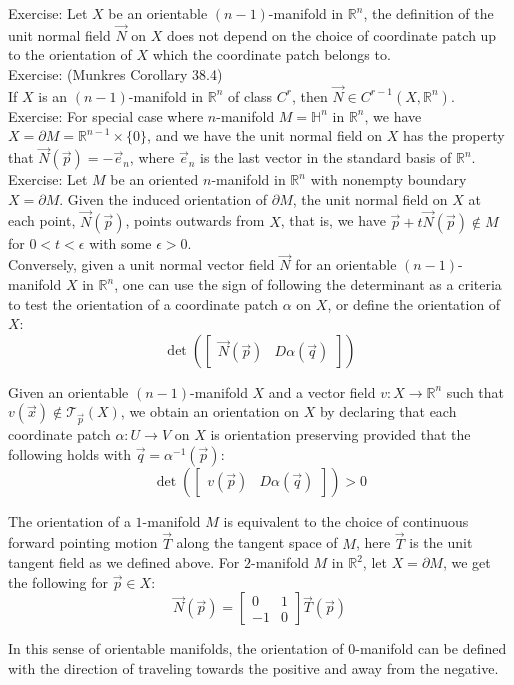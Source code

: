 \documentclass[15pt]{book}
\theoremstyle{break}
\theoremstyle{break}
\newcommand{\R}{\mathbb{R}}
\newcommand{\T}{\mathcal{T}}
\newcommand{\pd}{\partial}
\newcommand{\bmat}[1]{\begin{bmatrix} #1 \end{bmatrix}}
\newcommand{\exercise}{\color{green}Exercise: \color{black}}
\begin{document}
\exercise Let $X$ be an orientable $(n-1)$-manifold in $\R^n$, the definition of the unit normal field $\vec{N}$ on $X$ does not depend on the choice of coordinate patch up to the orientation of $X$ which the coordinate patch belongs to.\\ 

\exercise (Munkres Corollary 38.4)\\
If $X$ is an $(n-1)$-manifold in $\R^n$ of class $C^r$, then $\vec{N} \in C^{r-1}(X, \R^n)$. \\

\exercise For special case where $n$-manifold $M= \mathbb{H}^n$ in $\R^n$, we have $X = \pd M = \R^{n-1}\times \{0\}$, and we have the unit normal field on $X$ has the property that $\vec{N}(\vec{p}) = -\vec{e}_n$, where $\vec{e}_n$ is the last vector in the standard basis of $\R^n$. \\

\exercise Let $M$ be an oriented $n$-manifold in $\R^n$ with nonempty boundary $X = \pd M$. Given the induced orientation of $\partial M$, the unit normal field on $X$ at each point, $\vec{N}(\vec{p})$, points outwards from $X$, that is, we have $\vec{p} + t\vec{N}(\vec{p}) \notin M$ for $0<t<\epsilon$ with some $\epsilon>0$. \\

Conversely, given a unit normal vector field $\vec{N}$ for an orientable $(n-1)$-manifold $X$ in $\R^n$, one can use the sign of following the determinant as a criteria to test the orientation of a coordinate patch $\alpha$ on $X$, or define the orientation of $X$:
$$\det\left(\bmat{\vec{N}(\vec{p})  & D\alpha(\vec{q})}\right)$$ 

Given an orientable $(n-1)$-manifold $X$ and a vector field $v:X \to \R^{n}$ such that $v(\vec{x}) \notin \T_{\vec{p}}(X)$, we obtain an orientation on $X$ by declaring that each coordinate patch $\alpha:U \to V $ on $X$ is orientation preserving provided that the following holds with $\vec{q } = \alpha^{-1}(\vec{p})$: $$\det\left(\bmat{v(\vec{p}) &D\alpha(\vec{q})}\right) >0$$

The orientation of a $1$-manifold $M$ is equivalent to the choice of continuous forward pointing motion $\vec{T}$ along the tangent space of $M$, here $\vec{T}$ is the unit tangent field as we defined above. For $2$-manifold $M $ in $\R^2$, let $X = \pd M$, we get the following for $\vec{p}\in X$:
$$\vec{N}(\vec{p}) = \bmat{0&1 \\ -1 & 0}\vec{T}(\vec{p})$$

In this sense of orientable manifolds, the orientation of $0$-manifold can be defined with the direction of traveling towards the positive and away from the negative.\\
\end{document}
